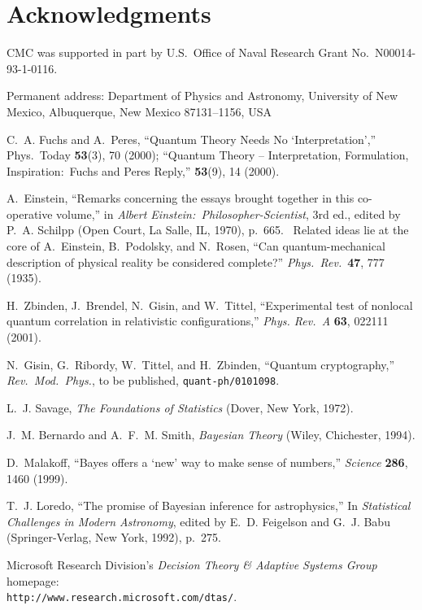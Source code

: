 \documentclass[aps,12pt]{revtex4}
\begin{document}
\section{Acknowledgments}

CMC was supported in part by U.S.\ Office of Naval Research Grant
No.~N00014-93-1-0116.

\begin{thebibliography}{99}

Permanent address: Department of Physics and Astronomy, University of
New Mexico, Albuquerque, New Mexico 87131--1156, USA

C.~A. Fuchs and A.~Peres, ``Quantum Theory Needs No
`Interpretation','' Phys.\ Today {\bf 53}(3), 70 (2000); ``Quantum
Theory -- Interpretation, Formulation, Inspiration:\ Fuchs and Peres
Reply,'' {\bf 53}(9), 14 (2000).

A.~Einstein, ``Remarks concerning the essays brought together in this
co-operative volume,'' in {\it Albert Einstein:\
Philosopher-Scientist}, 3rd ed., edited by P.~A. Schilpp (Open Court,
La Salle, IL, 1970), p.~665. \ Related ideas lie at the core of
A.~Einstein, B.~Podolsky, and N.~Rosen, ``Can quantum-mechanical
description of physical reality be considered complete?'' {\it Phys.\
Rev.}\ {\bf 47}, 777 (1935).

H.~Zbinden, J.~Brendel, N.~Gisin, and W.~Tittel, ``Experimental test
of nonlocal quantum correlation in relativistic configurations,''
{\it Phys. Rev.~A\/} {\bf 63}, 022111 (2001).

N.~Gisin, G.~Ribordy, W.~Tittel, and H.~Zbinden, ``Quantum cryptography,''
{\it Rev.\ Mod.\ Phys.}, to be published, {\tt quant-ph/0101098}.

\bibitem{Savage72}
L.~J. Savage, {\it The Foundations of Statistics\/} (Dover, New York,
1972).

J.~M. Bernardo and A.~F.~M. Smith, {\it Bayesian Theory\/} (Wiley,
Chichester, 1994).

D.~Malakoff, ``Bayes offers a `new' way to make sense of numbers,''
{\it Science\/} {\bf 286}, 1460 (1999).

T.~J. Loredo, ``The promise of Bayesian inference for astrophysics,''
In {\it Statistical Challenges in Modern Astronomy}, edited by E.~D.
Feigelson and G.~J. Babu (Springer-Verlag, New York, 1992), p.~275.

\bibitem{Microsoft}
Microsoft Research Division's {\it Decision Theory \& Adaptive
Systems Group\/} home\-page: \\
{\tt http://www.research.microsoft.com/dtas/}.


\end{thebibliography}
\end{document}
